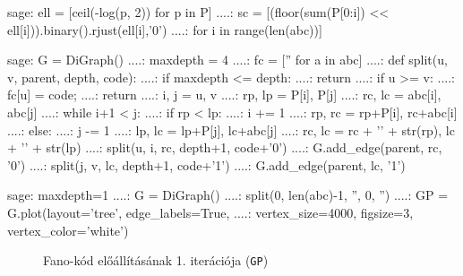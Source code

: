 \begin{sageexample}
  sage: ell = [ceil(-log(p, 2)) for p in P]
  ....: sc = [(floor(sum(P[0:i]) << ell[i])).binary().rjust(ell[i],'0')
  ....:       for i in range(len(abc))]
\end{sageexample}

\begin{table}[ht]
  \centering
\end{table}


\begin{sageexample}
  sage: G = DiGraph()
  ....: maxdepth = 4
  ....: fc = ['' for a in abc]
  ....: def split(u, v, parent, depth, code):
  ....:     if maxdepth <= depth:
  ....:         return
  ....:     if u >= v:
  ....:         fc[u] = code;
  ....:         return
  ....:     i, j = u, v
  ....:     rp, lp = P[i], P[j]
  ....:     rc, lc = abc[i], abc[j]
  ....:     while i+1 < j:
  ....:         if rp < lp:
  ....:             i += 1
  ....:             rp, rc = rp+P[i], rc+abc[i]
  ....:         else:
  ....:             j -= 1
  ....:             lp, lc = lp+P[j], lc+abc[j]
  ....:     rc, lc = rc + '\n' + str(rp), lc + '\n' + str(lp)
  ....:     split(u, i, rc, depth+1, code+'0')
  ....:     G.add_edge(parent, rc, '0')
  ....:     split(j, v, lc, depth+1, code+'1')
  ....:     G.add_edge(parent, lc, '1')
\end{sageexample}



\begin{sageexample}
  sage: maxdepth=1
  ....: G = DiGraph()
  ....: split(0, len(abc)-1, '', 0, '')
  ....: GP = G.plot(layout='tree', edge_labels=True,
  ....:             vertex_size=4000, figsize=3, vertex_color='white')
\end{sageexample}

\begin{figure}[ht]
  \centering
  \caption{Fano-kód előállításának 1. iterációja (\texttt{GP})}
\end{figure}


